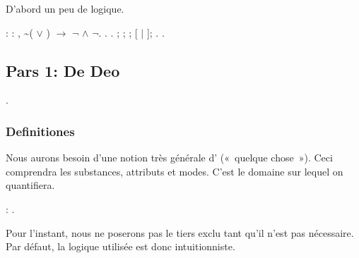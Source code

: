 \documentclass[12pt]{report}
\begin{document}
 D'abord un peu de logique. \begin{coqdoccode}
\coqdocemptyline
\coqdocnoindent
{} :\coqdoceol
\coqdocindent{1.00em}
\coqdockw{\ensuremath{\forall}}  : ,\coqdoceol
\coqdocindent{2.00em}
\~{}( \ensuremath{\lor} ) \ensuremath{\rightarrow} \ensuremath{\lnot} \ensuremath{\land} \ensuremath{\lnot}.\coqdoceol
\coqdocemptyline
\coqdocnoindent
{}.\coqdoceol
\coqdocindent{1.00em}
   .\coqdoceol
\coqdocindent{1.00em}
;  ;  ; [ \ensuremath{|} ];  .\coqdoceol
\coqdocnoindent
{}.\coqdoceol
\coqdocemptyline
\end{coqdoccode}
\par
\noindent\hrulefill\par
\noindent{}  

\subsection{Pars 1: De Deo}

\begin{coqdoccode}
\coqdocnoindent
{} .\coqdoceol
\coqdocemptyline
\end{coqdoccode}
\subsubsection{Definitiones}



 Nous aurons besoin d'une notion très générale d'
  (« quelque chose »). Ceci comprendra les substances, attributs et
  modes. C'est le domaine sur lequel on quantifiera. \begin{coqdoccode}
\coqdocemptyline
\coqdocindent{1.00em}
 : .\coqdoceol
\coqdocemptyline
\end{coqdoccode}
Pour l'instant, nous ne poserons pas le tiers exclu tant qu'il
  n'est pas nécessaire. Par défaut, la logique utilisée est donc
  intuitionniste. 

\par
\noindent\hrulefill\par
\noindent{}  
\end{document}
